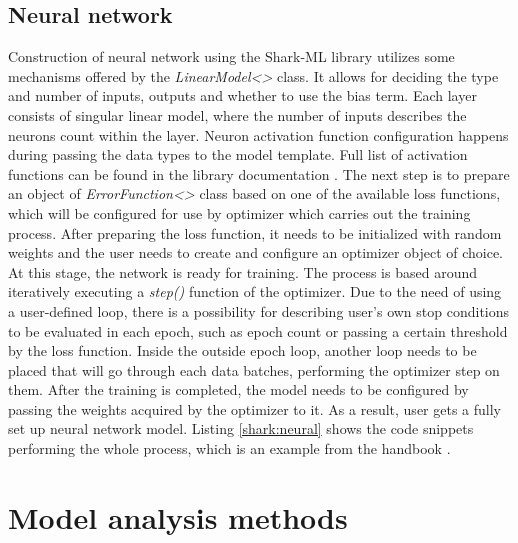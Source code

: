 
\subsection{Neural network}

Construction of neural network using the Shark-ML library utilizes some mechanisms offered by the \textit{LinearModel<>} class. It allows for deciding the type and number of inputs, outputs and whether to use the bias term. Each layer consists of singular linear model, where the number of inputs describes the neurons count within the layer. Neuron activation function configuration happens during passing the data types to the model template. Full list of activation functions can be found in the library documentation \cite{shark:activation}. The next step is to prepare an object of \textit{ErrorFunction<>} class based on one of the available loss functions, which will be configured for use by optimizer which carries out the training process. After preparing the loss function, it needs to be initialized with random weights and the user needs to create and configure an optimizer object of choice. At this stage, the network is ready for training. The process is based around iteratively executing a \textit{step()} function of the optimizer. Due to the need of using a user-defined loop, there is a possibility for describing user's own stop conditions to be evaluated in each epoch, such as epoch count or passing a certain threshold by the loss function. Inside the outside epoch loop, another loop needs to be placed that will go through each data batches, performing the optimizer step on them. After the training is completed, the model needs to be configured by passing the weights acquired by the optimizer to it. As a result, user gets a fully set up neural network model. Listing \ref{shark:neural} shows the code snippets performing the whole process, which is an example from the handbook \cite{handsOnMachineLearning}.


\section{Model analysis methods}

